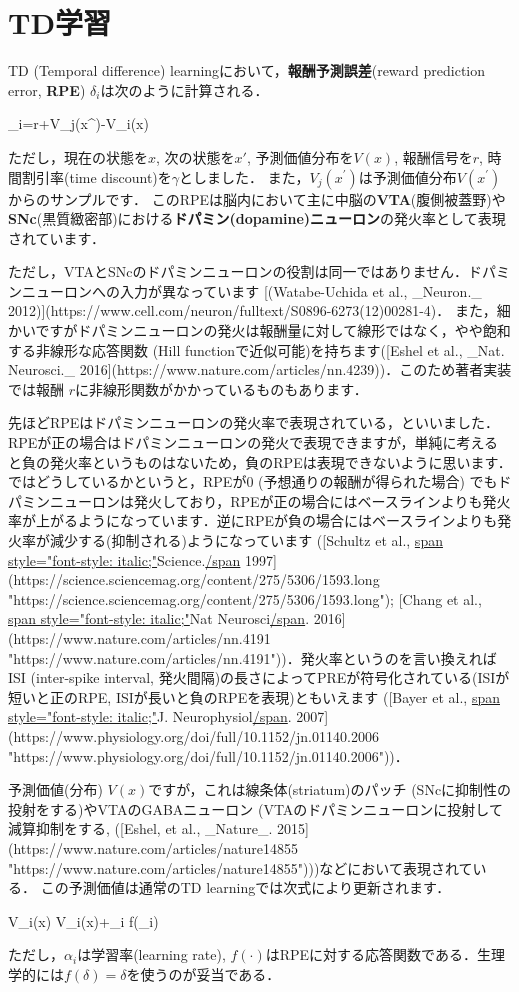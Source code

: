 \section{TD学習}

TD (Temporal difference) learningにおいて，\textbf{報酬予測誤差}(reward prediction error, \textbf{RPE}) $\delta_{i}$は次のように計算される． 

 
\delta_{i}=r+\gamma V_{j}\left(x^{\prime}\right)-V_{i}(x) 
 

ただし，現在の状態を$x$, 次の状態を$x'$, 予測価値分布を$V(x)$, 報酬信号を$r$, 時間割引率(time discount)を$\gamma$としました．
また，$V_{j}\left(x^{\prime}\right)$は予測価値分布$V\left(x^{\prime}\right)$からのサンプルです． このRPEは脳内において主に中脳の\textbf{VTA}(腹側被蓋野)や\textbf{SNc}(黒質緻密部)における\textbf{ドパミン(dopamine)ニューロン}の発火率として表現されています．

ただし，VTAとSNcのドパミンニューロンの役割は同一ではありません．ドパミンニューロンへの入力が異なっています [(Watabe-Uchida et al., _Neuron._ 2012)](https://www.cell.com/neuron/fulltext/S0896-6273(12)00281-4)． また，細かいですがドパミンニューロンの発火は報酬量に対して線形ではなく，やや飽和する非線形な応答関数 (Hill functionで近似可能)を持ちます([Eshel et al., _Nat. Neurosci._ 2016](https://www.nature.com/articles/nn.4239))．このため著者実装では報酬 $r$に非線形関数がかかっているものもあります．

先ほどRPEはドパミンニューロンの発火率で表現されている，といいました．RPEが正の場合はドパミンニューロンの発火で表現できますが，単純に考えると負の発火率というものはないため，負のRPEは表現できないように思います．ではどうしているかというと，RPEが0 (予想通りの報酬が得られた場合) でもドパミンニューロンは発火しており，RPEが正の場合にはベースラインよりも発火率が上がるようになっています．逆にRPEが負の場合にはベースラインよりも発火率が減少する(抑制される)ようになっています
    ([Schultz et al., \url{span style="font-style: italic;"}Science.\url{/span} 1997](https://science.sciencemag.org/content/275/5306/1593.long "https://science.sciencemag.org/content/275/5306/1593.long"); [Chang et al., \url{span style="font-style: italic;"}Nat Neurosci\url{/span}. 2016](https://www.nature.com/articles/nn.4191 "https://www.nature.com/articles/nn.4191"))．発火率というのを言い換えればISI (inter-spike interval, 発火間隔)の長さによってPREが符号化されている(ISIが短いと正のRPE, ISIが長いと負のRPEを表現)ともいえます ([Bayer et al., \url{span style="font-style: italic;"}J.
    Neurophysiol\url{/span}. 2007](https://www.physiology.org/doi/full/10.1152/jn.01140.2006 "https://www.physiology.org/doi/full/10.1152/jn.01140.2006"))．

予測価値(分布) $V(x)$ですが，これは線条体(striatum)のパッチ (SNcに抑制性の投射をする)やVTAのGABAニューロン (VTAのドパミンニューロンに投射して減算抑制をする, ([Eshel, et al., _Nature_. 2015](https://www.nature.com/articles/nature14855 "https://www.nature.com/articles/nature14855")))などにおいて表現されている． この予測価値は通常のTD learningでは次式により更新されます． 

 
V_{i}(x) \leftarrow V_{i}(x)+\alpha_{i} f\left(\delta_{i}\right) 
 

ただし，$\alpha_{i}$は学習率(learning rate), $f(\cdot)$はRPEに対する応答関数である．生理学的には$f(\delta)=\delta$を使うのが妥当である．
